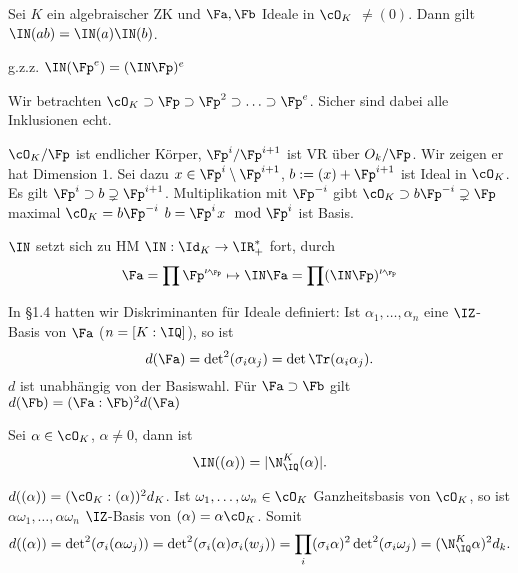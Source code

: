 
\renewcommand{\lecdate}{18.11.2014}

\begin{Fakt}
 Sei $K$ ein algebraischer ZK und $\Fa,\Fb$ Ideale in $\cO_K$ $\neq (0)$. Dann gilt $\IN(ab)=\IN(a)\IN(b)$.
\end{Fakt}

\begin{Beweis}
 g.z.z. $\IN(\Fp^e)=(\IN\Fp)^e$
 
 Wir betrachten $\cO_K\supset \Fp\supset\Fp^2\supset\ldots\supset \Fp^e$. Sicher sind dabei alle Inklusionen echt.
 
 $\cO_K/\Fp$ ist endlicher Körper, $\Fp^i/\Fp^{i+1}$ ist VR über $O_k/\Fp$. Wir zeigen er hat Dimension $1$. Sei dazu $x\in\Fp^i\setminus\Fp^{i+1}$, $b:=(x)+\Fp^{i+1}$ ist Ideal in $\cO_K$. Es gilt $\Fp^i\supset b\supsetneq \Fp^{i+1}$. Multiplikation mit $\Fp^{-i}$ gibt $\cO_K\supset b\Fp^{-i}\supsetneq\Fp$ maximal \folge $\cO_K=b\Fp^{-i}$ \folge $b=\Fp^i$\folge $x \mod{\Fp^i}$ ist Basis.
 
\end{Beweis}

\begin{Folgerung}
 $\IN$ setzt sich zu HM $\IN:\Id_K\rightarrow \IR_+^*$ fort, durch \[ \Fa=\prod\Fp^{\nu_\Fp} \mapsto \IN\Fa=\prod (\IN\Fp)^{\nu_\Fp}\]
\end{Folgerung}

\begin{Bemerkung}
 In \S 1.4 hatten wir Diskriminanten für Ideale definiert: Ist $\alpha_1,\ldots,\alpha_n$ eine $\IZ$-Basis von $\Fa$ ($n=[K:\IQ]$), so ist
 \[d(\Fa)=\det\nolimits^2(\sigma_i\alpha_j)=\det\Tr(\alpha_i\alpha_j). \]
 $d$ ist unabhängig von der Basiswahl. Für $\Fa\supset\Fb$ gilt $d(\Fb)=(\Fa:\Fb)^2d(\Fa)$
\end{Bemerkung}

\begin{Fakt}
 Sei $\alpha\in \cO_K$, $\alpha\neq 0$, dann ist \[ \IN((\alpha))=|\N_\IQ^K(\alpha)|.\]
\end{Fakt}

\begin{Beweis}
 $d((\alpha))=(\cO_K:(\alpha))^2d_K$. Ist $\omega_1,\ldots,\omega_n\in \cO_K$ Ganzheitsbasis von $\cO_K$, so ist $\alpha \omega_1,\ldots,\alpha \omega_n$ $\IZ$-Basis von $(\alpha)=\alpha \cO_K$. Somit \[d((\alpha))=\det\nolimits^2(\sigma_i(\alpha\omega_j))=\det\nolimits^2(\sigma_i(\alpha)\sigma_i(w_j))=\prod_i(\sigma_i\alpha)^2\det\nolimits^2(\sigma_i \omega_j)=(\N_\IQ^K\alpha)^2d_k.\]
 \end{Beweis}
 
